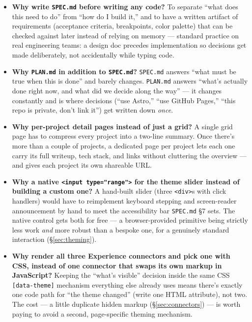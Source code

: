 \documentclass[11pt]{article}
\begin{document}
\begin{itemize}[leftmargin=1.4em]
  \item \textbf{Why write \texttt{SPEC.md} before writing any code?} To
  separate ``what does this need to do'' from ``how do I build it,''
  and to have a written artifact of requirements (acceptance criteria,
  breakpoints, color palette) that can be checked against later instead
  of relying on memory --- standard practice on real engineering teams:
  a design doc precedes implementation so decisions get made
  deliberately, not accidentally while typing code.
  \item \textbf{Why \texttt{PLAN.md} in addition to \texttt{SPEC.md}?}
  \texttt{SPEC.md} answers ``what must be true when this is done'' and
  barely changes. \texttt{PLAN.md} answers ``what's actually done right
  now, and what did we decide along the way'' --- it changes constantly
  and is where decisions (``use Astro,'' ``use GitHub Pages,'' ``this
  repo is private, don't link it'') get written down \emph{once}.
  \item \textbf{Why per-project detail pages instead of just a grid?} A
  single grid page has to compress every project into a two-line
  summary. Once there's more than a couple of projects, a dedicated page
  per project lets each one carry its full writeup, tech stack, and
  links without cluttering the overview --- and gives each project its
  own shareable URL.
  \item \textbf{Why a native \texttt{<input type="range">} for the theme
  slider instead of building a custom one?} A hand-built slider (three
  \texttt{<div>}s with click handlers) would have to reimplement keyboard
  stepping and screen-reader announcement by hand to meet the
  accessibility bar \texttt{SPEC.md} \S7 sets. The native control gets
  both for free --- a browser-provided primitive being strictly less work
  \emph{and} more robust than a bespoke one, for a genuinely standard
  interaction (\S\ref{sec:theming}).
  \item \textbf{Why render all three Experience connectors and pick one
  with CSS, instead of one connector that swaps its own markup in
  JavaScript?} Keeping the ``what's visible'' decision inside the same
  CSS \texttt{[data-theme]} mechanism everything else already uses means
  there's exactly one code path for ``the theme changed'' (write one HTML
  attribute), not two. The cost --- a little duplicate hidden markup
  (\S\ref{sec:connectors}) --- is worth paying to avoid a second,
  page-specific theming mechanism.
\end{itemize}
\end{document}
